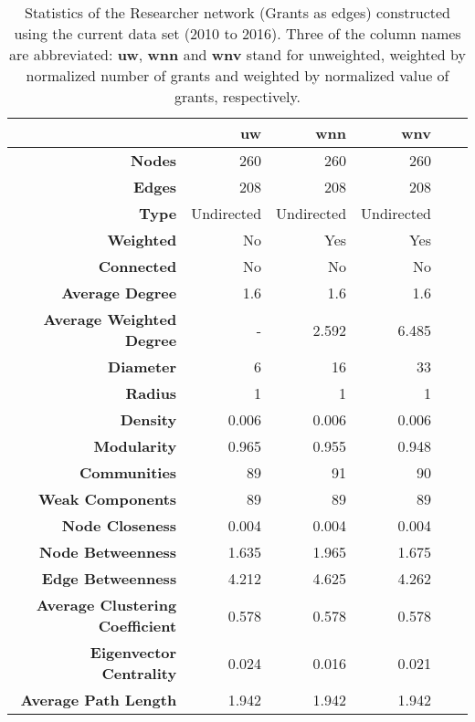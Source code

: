 \begin{table}[!htbp]
\centering
\caption[Statistics of the Researcher network (Grants as edges) constructed using the current data set (2010 to 2016)]{Statistics of the Researcher network (Grants as edges) constructed using the current data set (2010 to 2016). Three of the column names are abbreviated: \textbf{uw}, \textbf{wnn} and \textbf{wnv} stand for unweighted, weighted by normalized number of grants and weighted by normalized value of grants, respectively.}
\label{table:researcher_b_current_stats_appendix}
\begin{tabular}{r|rrrrr}
\textbf{} & \textbf{uw} & \textbf{wnn} & \textbf{wnv}\\
\hline
\textbf{Nodes} & {260} & {260} & {260}\\
\textbf{Edges} & {208} & {208} & {208}\\
\textbf{Type} & {Undirected} & {Undirected} & {Undirected}\\
\textbf{Weighted} & {No} & {Yes} & {Yes}\\
\textbf{Connected} & {No} & {No} & {No}\\
\textbf{Average Degree} & {1.6} & {1.6} & {1.6}\\
\textbf{Average Weighted Degree} & {-} & {2.592} & {6.485}\\
\textbf{Diameter} & {6} & {16} & {33}\\
\textbf{Radius} & {1} & {1} & {1}\\
\textbf{Density} & {0.006} & {0.006} & {0.006}\\
\textbf{Modularity} & {0.965} & {0.955} & {0.948}\\
\textbf{Communities} & {89} & {91} & {90}\\
\textbf{Weak Components} & {89} & {89} & {89}\\
\textbf{Node Closeness} & {0.004} & {0.004} & {0.004}\\
\textbf{Node Betweenness} & {1.635} & {1.965} & {1.675}\\
\textbf{Edge Betweenness} & {4.212} & {4.625} & {4.262}\\
\textbf{Average Clustering Coefficient} & {0.578} & {0.578} & {0.578}\\
\textbf{Eigenvector Centrality} & {0.024} & {0.016} & {0.021}\\
\textbf{Average Path Length} & {1.942} & {1.942} & {1.942}
\end{tabular}
\end{table}

